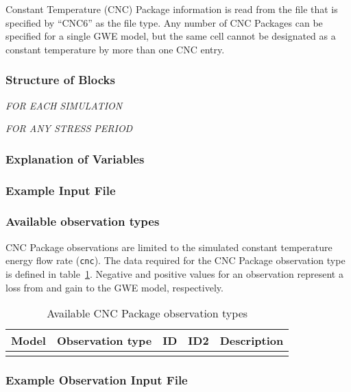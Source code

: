 Constant Temperature (CNC) Package information is read from the file that is specified by ``CNC6'' as the file type.  Any number of CNC Packages can be specified for a single GWE model, but the same cell cannot be designated as a constant temperature by more than one CNC entry. 

\vspace{5mm}
\subsubsection{Structure of Blocks}
\vspace{5mm}

\noindent \textit{FOR EACH SIMULATION}


\vspace{5mm}
\noindent \textit{FOR ANY STRESS PERIOD}

\packageperioddescription

\vspace{5mm}
\subsubsection{Explanation of Variables}
\begin{description}

\end{description}

\vspace{5mm}
\subsubsection{Example Input File}


\vspace{5mm}
\subsubsection{Available observation types}
CNC Package observations are limited to the simulated constant temperature energy flow rate (\texttt{cnc}). The data required for the CNC Package observation type is defined in table~\ref{table:gwe-cncobstype}. Negative and positive values for an observation represent a loss from and gain to the GWE model, respectively.

\begin{longtable}{p{2cm} p{2.75cm} p{2cm} p{1.25cm} p{7cm}}
\caption{Available CNC Package observation types} \tabularnewline

\hline
\hline
\textbf{Model} & \textbf{Observation type} & \textbf{ID} & \textbf{ID2} & \textbf{Description} \\
\hline
\endhead

\hline
\endfoot


\label{table:gwe-cncobstype}
\end{longtable}

\vspace{5mm}
\subsubsection{Example Observation Input File}

